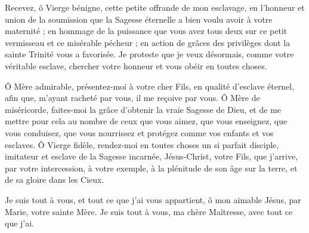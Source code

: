 Recevez, ô Vierge bénigne, cette petite offrande de mon esclavage, en l’honneur et union de la soumission que la Sagesse éternelle a bien voulu avoir à votre maternité ; en hommage de la puissance que vous avez tous deux sur ce petit vermisseau et ce misérable pécheur ; en action de grâces des privilèges dont la sainte Trinité vous a favorisée. Je proteste que je veux désormais, comme votre véritable esclave, chercher votre honneur et vous obéir en toutes choses.

Ô Mère admirable, présentez-moi à votre cher Fils, en qualité d’esclave éternel, afin que, m’ayant racheté par vous, il me reçoive par vous. Ô Mère de miséricorde, faites-moi la grâce d’obtenir la vraie Sagesse de Dieu, et de me mettre pour cela au nombre de ceux que vous aimez, que vous enseignez, que vous conduisez, que vous nourrissez et protégez comme vos enfants et vos esclaves. Ô Vierge fidèle, rendez-moi en toutes choses un si parfait disciple, imitateur et esclave de la Sagesse incarnée, Jésus-Christ, votre Fils, que j’arrive, par votre intercession, à votre exemple, à la plénitude de son âge sur la terre, et de sa gloire dans les Cieux.


\priere{}
\priere Je suis tout à vous, et tout ce que j’ai vous appartient, ô mon aimable Jésus, par Marie, votre sainte Mère.
\priere{}
\priere Je suis tout à vous, ma chère Maîtresse, avec tout ce que j’ai.
